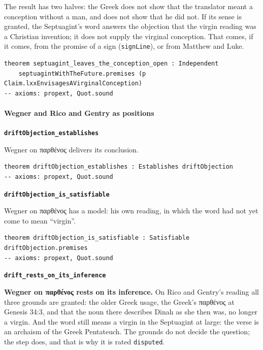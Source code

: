 \documentclass[11pt]{article}
\begin{document}
The result has two halves: the Greek does not show that the translator meant a conception without a man, and does not show that he did not. If its sense is granted, the Septuagint’s word answers the objection that the virgin reading was a Christian invention; it does not supply the virginal conception. That comes, if it comes, from the promise of a sign (\texttt{sign\allowbreak{}Line}), or from Matthew and Luke.

{\small\begin{verbatim}
theorem septuagint_leaves_the_conception_open : Independent
    septuagintWithTheFuture.premises (p Claim.lxxEnvisagesAVirginalConception)
-- axioms: propext, Quot.sound
\end{verbatim}}
\paragraph*{Wegner and Rico and Gentry as positions}
\leavevmode\par\nobreak
\par\medskip\noindent\textbf{\texttt{drift\allowbreak{}Objection\_\allowbreak{}establishes}}\par\nobreak\noindent
Wegner on παρθένος delivers its conclusion.

{\small\begin{verbatim}
theorem driftObjection_establishes : Establishes driftObjection
-- axioms: propext, Quot.sound
\end{verbatim}}
\par\medskip\noindent\textbf{\texttt{drift\allowbreak{}Objection\_\allowbreak{}is\_\allowbreak{}satisfiable}}\par\nobreak\noindent
Wegner on παρθένος has a model: his own reading, in which the word had not yet come to mean “virgin”.

{\small\begin{verbatim}
theorem driftObjection_is_satisfiable : Satisfiable driftObjection.premises
-- axioms: propext, Quot.sound
\end{verbatim}}
\par\medskip\noindent\textbf{\texttt{drift\_\allowbreak{}rests\_\allowbreak{}on\_\allowbreak{}its\_\allowbreak{}inference}}\par\nobreak\noindent
\textbf{Wegner on παρθένος rests on its inference.} On Rico and Gentry’s reading all three grounds are granted: the older Greek usage, the Greek’s παρθένος at Genesis 34:3, and that the noun there describes Dinah as she then was, no longer a virgin. And the word still means a virgin in the Septuagint at large: the verse is an archaism of the Greek Pentateuch. The grounds do not decide the question; the step does, and that is why it is rated \texttt{disputed}.
\end{document}
